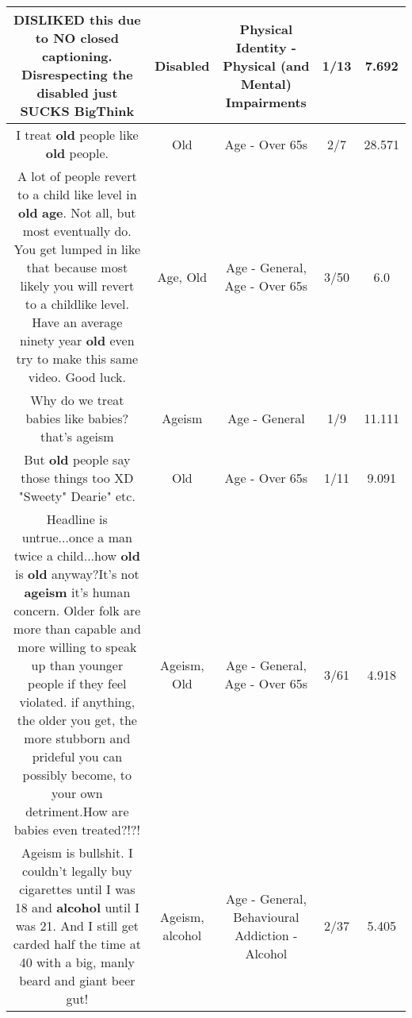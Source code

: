 \documentclass[11pt]{article}
\newlength\mylength
\begin{document}
\begin{center}
\begin{longtable}{|C{.65\mylength}|C{.30\mylength}|C{.12\mylength}|C{.12\mylength}|C{.12\mylength}|}
  \small DISLIKED this due to NO closed captioning. Disrespecting the \textbf{disabled} just SUCKS BigThink\normalsize   & Disabled & Physical Identity - Physical (and Mental) Impairments & 1/13 & 7.692 \\  \hline
  \small I treat \textbf{old} people like \textbf{old} people.\normalsize   & Old & Age - Over 65s & 2/7 & 28.571 \\  \hline
  \small A lot of people revert to a child like level in \textbf{old} \textbf{age}. Not all, but most eventually do. You get lumped in like that because most likely you will revert to a childlike level. Have an average ninety year \textbf{old} even try to make this same video. Good luck.\normalsize   & Age, Old & Age - General, Age - Over 65s & 3/50 & 6.0 \\  \hline
  \small Why do we treat babies like babies? that's ageism\normalsize   & Ageism & Age - General & 1/9 & 11.111 \\  \hline
  \small But \textbf{old} people say those things too XD  "Sweety"  Dearie"  etc.\normalsize   & Old & Age - Over 65s & 1/11 & 9.091 \\  \hline
  \small Headline is untrue...once a man twice a child...how \textbf{old} is \textbf{old} anyway?It's not \textbf{ageism} it's human concern. Older folk are more than capable and more willing to speak up than younger people if they feel violated. if anything, the older you get, the more stubborn and prideful you can possibly become, to your own detriment.How are babies even treated?!?!\normalsize   & Ageism, Old & Age - General, Age - Over 65s & 3/61 & 4.918 \\  \hline
  \small Ageism is bullshit. I couldn't legally buy cigarettes until I was 18 and \textbf{alcohol} until I was 21. And I still get carded half the time at 40 with a big, manly beard and giant beer gut!\normalsize   & Ageism, alcohol & Age - General, Behavioural Addiction - Alcohol & 2/37 & 5.405 \\  \hline

\end{longtable}
\end{center}
\end{document}
